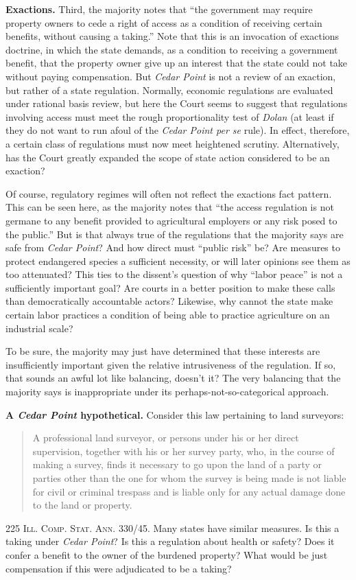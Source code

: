 \item \textbf{Exactions.} Third, the majority notes that ``the government may
require property owners to cede a right of access as a condition of receiving
certain benefits, without causing a taking.'' Note that this is an invocation of
exactions doctrine, in which the state demands, as a condition to receiving a
government benefit, that the property owner give up an interest that the state
could not take without paying compensation. But \textit{Cedar Point} is not a
review of an exaction, but rather of a state regulation. Normally, economic
regulations are evaluated under rational basis review, but here the Court seems
to suggest that regulations involving access must meet the rough proportionality
test of \textit{Dolan} (at least if they do not want to run afoul of the
\textit{Cedar Point per se} rule). In effect, therefore, a certain class of
regulations must now meet heightened scrutiny. Alternatively, has the Court
greatly expanded the scope of state action considered to be an exaction?

Of course, regulatory regimes will often not reflect the exactions fact
pattern. This can be seen here, as the majority notes that ``the access
regulation is not germane to any benefit provided to agricultural employers or
any risk posed to the public.'' But is that always true of the regulations that
the majority says are safe from \textit{Cedar Point}? And how direct must
``public risk'' be? Are measures to protect endangered species a sufficient
necessity, or will later opinions see them as too attenuated? This ties to the
dissent's question of why ``labor peace'' is not a sufficiently important goal?
Are courts in a better position to make these calls than democratically
accountable actors? Likewise, why cannot the state make certain labor practices
a condition of being able to practice agriculture on an industrial scale? 

To be sure, the majority may just have determined that these interests
are insufficiently important given the relative intrusiveness of the regulation.
If so, that sounds an awful lot like balancing, doesn't it? The very balancing
that the majority says is inappropriate under its perhaps-not-so-categorical
approach.

\item \textbf{A \textit{Cedar Point} hypothetical.} Consider
this law pertaining to land surveyors:
\begin{quote}
A professional land surveyor, or persons under his or her direct
supervision, together with his or her survey party, who, in the course of making
a survey, finds it necessary to go upon the land of a party or parties other
than the one for whom the survey is being made is not liable for civil or
criminal trespass and is liable only for any actual damage done to the land or
property.
\end{quote}
225 \textsc{Ill. Comp. Stat. Ann.} 330/45. Many states have similar measures. Is
this a taking under \textit{Cedar Point}? Is this a regulation about health or
safety? Does it confer a benefit to the owner of the burdened property? What
would be just compensation if this were adjudicated to be a taking?

